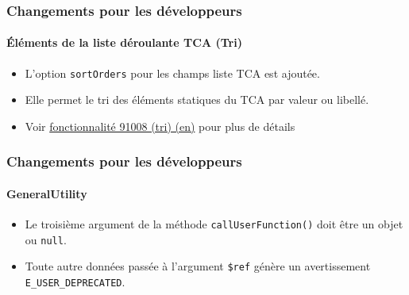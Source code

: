 
\begin{frame}[fragile]
	\frametitle{Changements pour les développeurs}
	\framesubtitle{Éléments de la liste déroulante TCA (Tri)}

	\begin{itemize}
		\item L'option \texttt{sortOrders} pour les champs liste TCA est ajoutée.
		\item Elle permet le tri des éléments statiques du TCA par valeur ou libellé.
		\item Voir
			\href{https://docs.typo3.org/c/typo3/cms-core/master/en-us/Changelog/10.4/Feature-91008-ItemSortingForTCASelectItems.html}{fonctionnalité 91008 (tri) (en)}
			pour plus de détails
	\end{itemize}

\end{frame}


\begin{frame}[fragile]
	\frametitle{Changements pour les développeurs}
	\framesubtitle{GeneralUtility}

	\begin{itemize}
		\item Le troisième argument de la méthode \texttt{callUserFunction()}
			doit être un objet ou \texttt{null}.
		\item Toute autre données passée à l'argument \texttt{\$ref} génère un
			avertissement \texttt{E\_USER\_DEPRECATED}.
	\end{itemize}

\end{frame}


